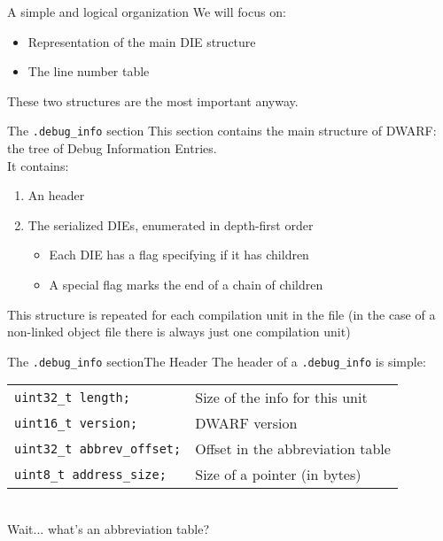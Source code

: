 \begin{frame}{A simple and logical organization}
We will focus on:
\begin{itemize}
\item Representation of the main DIE structure
\item The line number table
\end{itemize}
\bigskip
These two structures are the most important anyway.
\end{frame}


\begin{frame}{The \texttt{.debug\_info} section}
This section contains the main structure of DWARF: the tree of Debug
Information Entries.\\
\medskip
It contains:
\begin{enumerate}
\item An header
\item The serialized DIEs, enumerated in depth-first order
	\begin{itemize}
	\normalsize
	\item Each DIE has a flag specifying if it has children
	\item A special flag marks the end of a chain of children
	\end{itemize}
\end{enumerate}
\bigskip
This structure is repeated for each compilation unit in the file
(in the case of a non-linked object file there 
is always just one compilation unit)
\end{frame}


\begin{frame}{The \texttt{.debug\_info} section}{The Header}
The header of a \texttt{.debug\_info} is simple:\\
\medskip
\begin{tabular}{ l l }
\texttt{uint32\_t length;} & Size of the info for this unit \\
\texttt{uint16\_t version;} & DWARF version\\
\texttt{uint32\_t abbrev\_offset;} & Offset in the \alert{abbreviation table} \\
\texttt{uint8\_t address\_size;} & Size of a pointer (in bytes) \\
\end{tabular}\\
\bigskip
Wait... what's an \alert{abbreviation table}?
\end{frame}


